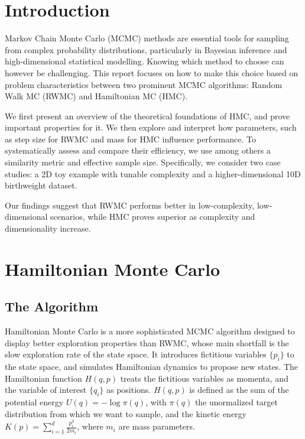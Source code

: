 \documentclass[a4paper, 12pt,oneside]{article}
\begin{document}
 
	 
	\clearpage
	\tableofcontents
	\thispagestyle{empty} 
	\clearpage
	\setcounter{page}{1}
	\section{Introduction}
	Markov Chain Monte Carlo (MCMC) methods are essential tools for sampling from complex probability distributions, particularly in Bayesian inference and high-dimensional statistical modelling. Knowing which method to choose can however be challenging. This report focuses on how to make this choice based on problem characteristics between two prominent MCMC algorithms: Random Walk MC (RWMC) and Hamiltonian MC (HMC). 
	
	We first present an overview of the theoretical foundations of HMC, and prove important properties for it.	
	We then explore and interpret how parameters, such as step size for RWMC and mass for HMC influence performance. To systematically assess and compare their efficiency, we use among others a similarity metric and effective sample size. 
	Specifically, we consider two case studies: a 2D toy example with tunable complexity and a higher-dimensional 10D birthweight dataset. 
	
	Our findings suggest that RWMC performs better in low-complexity, low-dimensional scenarios, while HMC proves superior as complexity and dimensionality increase.
	\section{Hamiltonian Monte Carlo}
		\subsection{The Algorithm}
		Hamiltonian Monte Carlo is a more sophisticated MCMC algorithm designed to display better exploration properties than RWMC, whose main shortfall is the slow exploration rate of the state space.
		It introduces fictitious variables $\{p_i\}$ to the state space, and simulates Hamiltonian dynamics to propose new states. The Hamiltonian function $H(q, p)$  treats the fictitious variables as momenta, and the variable of interest $\{q_i\}$ as positions.
		$H(q, p)$ is defined as the sum of the potential energy $U(q)= -\log \pi(q)$, with $\pi(q)$ the unormalized target distribution from which we want to sample, and the kinetic energy $K(p)=\sum_{i=1}^d \frac{p_i^2}{2 m_i}$, where $m_i$ are mass parameters.
\end{document}
